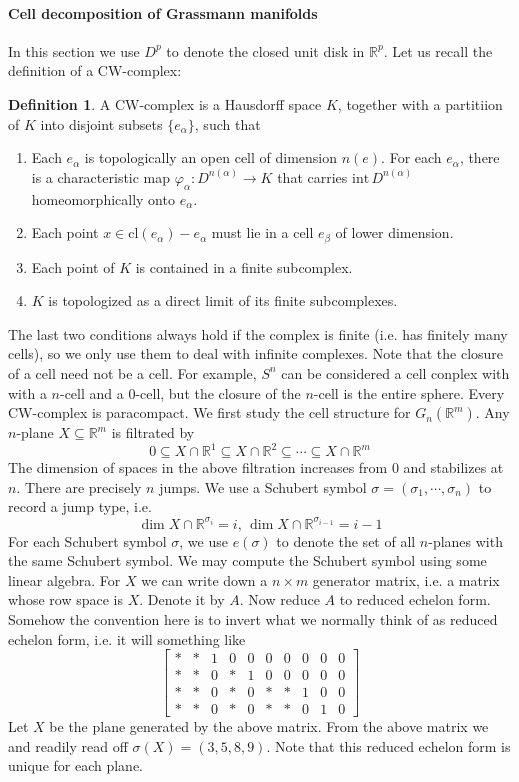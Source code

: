 \documentclass[12pt]{article}
\theoremstyle{plain}
\theoremstyle{definition}
\newtheorem{definition}[equation]{Definition}
\newcommand{\IR}{\mathbb{R}}
\newcommand{\<}{\langle}
\renewcommand{\>}{\rangle}
\newcommand{\cl}{\mathrm{cl}}
\newcommand{\intr}{\mathrm{int}\,}
\begin{document}
\paragraph{Cell decomposition of Grassmann manifolds}
In this section we use $D^p$ to denote the closed unit disk in $\IR^p$. 
Let us recall the definition of a CW-complex:
\begin{definition} A CW-complex is a Hausdorff space $K$, together with a partitiion of $K$ into disjoint subsets $\{ e_\alpha \}$, such that 
\begin{enumerate}
\item Each $e_\alpha$ is topologically an open cell of dimension $n(e)$. For each $e_\alpha$, there is a characteristic map $\varphi_\alpha : D^{n(\alpha)} \to K$ that carries $\intr D^{n(\alpha)}$ homeomorphically onto $e_\alpha$. 
\item Each point $x \in \cl(e_\alpha) - e_\alpha$ must lie in a cell $e_\beta$ of lower dimension. 
\item Each point of $K$ is contained in a finite subcomplex. 
\item $K$ is topologized as a direct limit of its finite subcomplexes. 
\end{enumerate}
\end{definition}
The last two conditions always hold if the complex is finite (i.e. has finitely many cells), so we only use them to deal with infinite complexes. 
Note that the closure of a cell need not be a cell. For example, $S^n$ can be considered a cell conplex with with a $n$-cell and a $0$-cell, but the closure of the $n$-cell is the entire sphere. Every CW-complex is paracompact. 
We first study the cell structure for $G_n(\IR^m)$. Any $n$-plane $X \subseteq \IR^m$ is filtrated by 
$$0 \subseteq X \cap \IR^1 \subseteq X \cap \IR^2 \subseteq \cdots \subseteq X \cap \IR^m $$ 
The dimension of spaces in the above filtration increases from $0$ and stabilizes at $n$. There are precisely $n$ jumps. We use a Schubert symbol $\sigma = ( \sigma_1, \cdots, \sigma_n)$ to record a jump type, i.e. $$ \dim X \cap \IR^{\sigma_i} = i, \, \dim X \cap \IR^{\sigma_{i-1}} = i - 1$$
For each Schubert symbol $\sigma$, we use $e(\sigma)$ to denote the set of all $n$-planes with the same Schubert symbol. We may compute the Schubert symbol using some linear algebra. For $X$ we can write down a $n \times m$ generator matrix, i.e. a matrix whose row space is $X$. Denote it by $A$. Now reduce $A$ to reduced echelon form. Somehow the convention here is to invert what we normally think of as reduced echelon form, i.e. it will something like
$$ \begin{bmatrix}
* & * & 1 & 0 & 0 & 0 & 0 & 0 & 0 & 0 \\
* & * & 0 & * & 1 & 0 & 0 & 0 & 0 & 0 \\
* & * & 0 & * & 0 & * & * & 1 & 0 & 0 \\
* & * & 0 & * & 0 & * & * & 0 & 1 & 0 
\end{bmatrix}$$ 
Let $X$ be the plane generated by the above matrix. From the above matrix we and readily read off $\sigma(X) = (3, 5,8, 9)$. Note that this reduced echelon form is unique for each plane.
\end{document}
